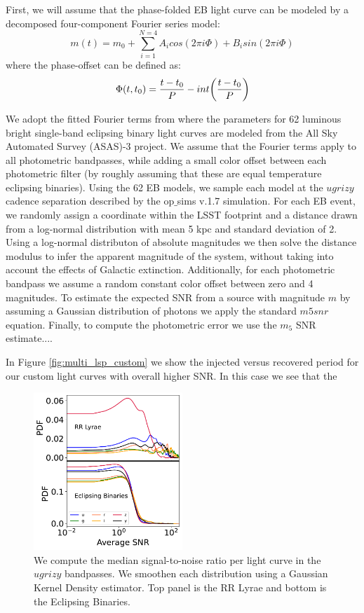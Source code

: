 \documentclass[DM,authoryear,toc]{lsstdoc}
\begin{document}
First, we will assume that the phase-folded EB light curve can be modeled by a decomposed four-component Fourier series model:
\begin{equation}
m(t) = m_0 + \sum_{i=1}^{N=4} A_icos(2\pi i\Phi) + B_isin(2\pi i \Phi)
\end{equation}
where the phase-offset can be defined as:
\begin{equation}
\Phi(t,t_{0}) = \frac{t-t_{0}}{P}-int\bigg{(}\frac{t-t_{0}}{P} \bigg{)}
\end{equation}

We adopt the fitted Fourier terms from \citet{Deb:Deb11} where the parameters for 62 luminous bright single-band eclipsing binary light curves are modeled from the All Sky Automated Survey
(ASAS)-3 project. We assume that the Fourier terms apply to all photometric bandpasses, while adding a small color offset between each photometric filter (by roughly assuming that these are equal temperature eclipsing binaries). Using the 62 EB models, we sample each model at the $ugrizy$ cadence separation described by the op$\_$sims v.1.7 simulation. For each EB event, we randomly assign a coordinate within the LSST footprint and a distance drawn from a log-normal distribution with mean 5 kpc and standard deviation of 2. Using a log-normal distributon of absolute magnitudes we then solve the distance modulus to infer the apparent magnitude of the system, without taking into account the effects of Galactic extinction. Additionally, for each photometric bandpass we assume a random constant color offset between zero and 4 magnitudes. To estimate the expected SNR from a source with magnitude $m$ by assuming a Gaussian distribution of photons we apply the standard $m5snr$ equation. Finally, to compute the photometric error we use the $m_5$ SNR estimate....


In Figure \ref{fig:multi_lsp_custom} we show the injected versus recovered period for our custom light curves with overall higher SNR. In this case we see that the 

\begin{figure}
  \includegraphics[width=0.5\textwidth]{figures/snr_average.pdf}
  \centering 
  \caption{We compute the median signal-to-noise ratio per light curve in the $ugrizy$ bandpasses.  We smoothen each distribution using a Gaussian Kernel Density estimator. Top panel is the RR Lyrae and bottom is the Eclipsing Binaries. }
  \label{fig:snr_average}
\end{figure}
\end{document}

